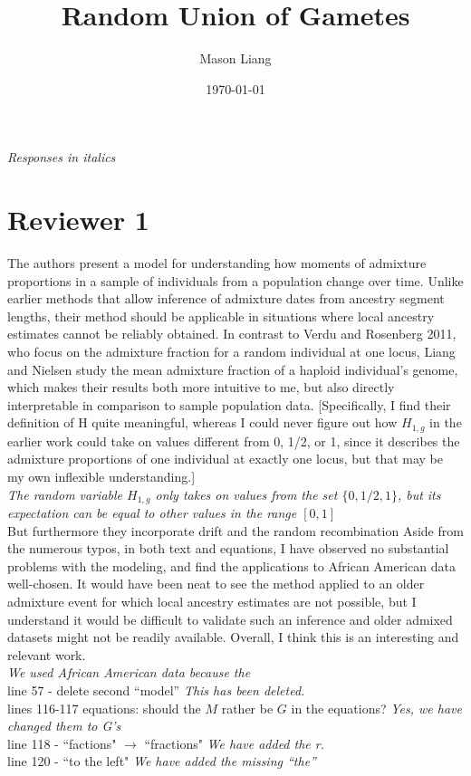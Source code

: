 \documentclass[11pt]{amsart}
\title{Random Union of Gametes}
\author{Mason Liang}
\date{\today}
\begin{document}
\textit{Responses in italics}
\section{Reviewer 1}
The authors present a model for understanding how moments of admixture proportions in a 
sample of individuals from a population change over time. Unlike earlier methods that allow 
inference of admixture dates from ancestry segment lengths, their method should be applicable in 
situations where local ancestry estimates cannot be reliably obtained. 
In contrast to Verdu and Rosenberg 2011, who focus on the admixture fraction for a random 
individual at one locus, Liang and Nielsen study the mean admixture fraction of a haploid 
individual’s genome, which makes their results both more intuitive to me, but also directly 
interpretable in comparison to sample population data. [Specifically, I find their definition of H 
quite meaningful, whereas I could never figure out how $H_{1,g}$ in the earlier work could take on 
values different from 0, 1/2, or 1, since it describes the admixture proportions of one individual at 
exactly one locus, but that may be my own inflexible understanding.]\\
\textit{The random variable $H_{1,g}$ only takes on values from the set $\{0, 1/2, 1\}$, but its expectation can be equal to other values in the range $[0,1]$}\\
But furthermore they incorporate drift and the random recombination 
Aside from the numerous typos, in both text and equations, I have observed no substantial 
problems with the modeling, and find the applications to African American data well-chosen. It 
would have been neat to see the method applied to an older admixture event for which local 
ancestry estimates are not possible, but I understand it would be difficult to validate such an 
inference and older admixed datasets might not be readily available. Overall, I think this is an 
interesting and relevant work.\\ 
\textit{We used African American data because the }
\\
line 57 - delete second “model” \textit{This has been deleted.}\\
lines 116-117 equations: should the $M$ rather be $G$ in the equations? \textit{Yes, we have changed them to G's}\\
line 118 - ``factions" $\rightarrow$ ``fractions" \textit{We have added the r.}\\
line 120 - ``to the left" \textit{We have added the missing ``the''}\\
\end{document}
